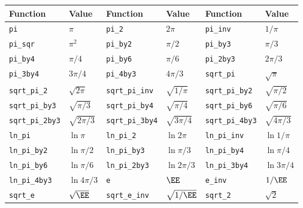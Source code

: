 \begin{table}[ht]
  \begin{tabu}{X[2l]X[l]X[2l]X[l]X[2l]X[l]}
    \toprule
    Function & Value &
    Function & Value &
    Function & Value \\
    \midrule
    \texttt{pi}             & $\pi$              &
    \texttt{pi\_2}          & $2\pi$             &
    \texttt{pi\_inv}        & $1/\pi$            \\
    \texttt{pi\_sqr}        & $\pi^2$            &
    \texttt{pi\_by2}        & $\pi/2$            &
    \texttt{pi\_by3}        & $\pi/3$            \\
    \texttt{pi\_by4}        & $\pi/4$            &
    \texttt{pi\_by6}        & $\pi/6$            &
    \texttt{pi\_2by3}       & $2\pi/3$           \\
    \texttt{pi\_3by4}       & $3\pi/4$           &
    \texttt{pi\_4by3}       & $4\pi/3$           &
    \texttt{sqrt\_pi}       & $\sqrt{\pi}$       \\
    \texttt{sqrt\_pi\_2}    & $\sqrt{2\pi}$      &
    \texttt{sqrt\_pi\_inv}  & $\sqrt{1/\pi}$     &
    \texttt{sqrt\_pi\_by2}  & $\sqrt{\pi/2}$     \\
    \texttt{sqrt\_pi\_by3}  & $\sqrt{\pi/3}$     &
    \texttt{sqrt\_pi\_by4}  & $\sqrt{\pi/4}$     &
    \texttt{sqrt\_pi\_by6}  & $\sqrt{\pi/6}$     \\
    \texttt{sqrt\_pi\_2by3} & $\sqrt{2\pi/3}$    &
    \texttt{sqrt\_pi\_3by4} & $\sqrt{3\pi/4}$    &
    \texttt{sqrt\_pi\_4by3} & $\sqrt{4\pi/3}$    \\
    \texttt{ln\_pi}         & $\ln{\pi}$         &
    \texttt{ln\_pi\_2}      & $\ln{2\pi}$        &
    \texttt{ln\_pi\_inv}    & $\ln{1/\pi}$       \\
    \texttt{ln\_pi\_by2}    & $\ln{\pi/2}$       &
    \texttt{ln\_pi\_by3}    & $\ln{\pi/3}$       &
    \texttt{ln\_pi\_by4}    & $\ln{\pi/4}$       \\
    \texttt{ln\_pi\_by6}    & $\ln{\pi/6}$       &
    \texttt{ln\_pi\_2by3}   & $\ln{2\pi/3}$      &
    \texttt{ln\_pi\_3by4}   & $\ln{3\pi/4}$      \\
    \texttt{ln\_pi\_4by3}   & $\ln{4\pi/3}$      &
    \texttt{e}              & $\EE$              &
    \texttt{e\_inv}         & $1/\EE$            \\
    \texttt{sqrt\_e}        & $\sqrt{\EE}$       &
    \texttt{sqrt\_e\_inv}   & $\sqrt{1/\EE}$     &
    \texttt{sqrt\_2}        & $\sqrt{2}$         \\

\end{tabu}
\end{table}
